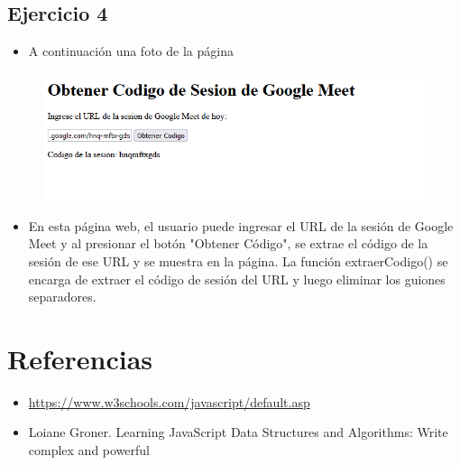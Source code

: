 \documentclass{article}
\begin{document}
	\subsection{Ejercicio 4}
		
	\begin{itemize}
			\item A continuación una foto de la página
		\end{itemize} 
		\begin{figure}[H]
			\centering
			\includegraphics[width=1.0\textwidth,keepaspectratio]{img/ejercicio4.PNG}
		\end{figure}
		\begin{itemize}
			\item En esta página web, el usuario puede ingresar el URL de la sesión de Google Meet y al presionar el botón "Obtener Código", se extrae el código de la sesión de ese URL y se muestra en la página. La función extraerCodigo() se encarga de extraer el código de sesión del URL y luego eliminar los guiones separadores.
		\end{itemize} 
\section{Referencias}
\begin{itemize}			
	\item \url{https://www.w3schools.com/javascript/default.asp}
	\item	Loiane Groner. Learning JavaScript Data Structures and Algorithms: Write complex and powerful
\end{itemize}	
	
%
%
%
			
\end{document}
